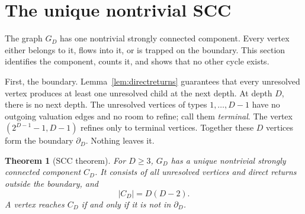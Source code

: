 \documentclass[11pt]{amsart}
\newtheorem{theorem}{Theorem}[section]
\theoremstyle{definition}
\theoremstyle{remark}
\newcommand{\bdD}{\partial_D}
\begin{document}
\section{The unique nontrivial SCC}\label{sec:core}
The graph $G_D$ has one nontrivial strongly connected component.
Every vertex either belongs to it, flows into it, or is trapped on
the boundary.  This section identifies the component, counts it, and
shows that no other cycle exists.

First, the boundary.  Lemma~\ref{lem:directreturns} guarantees that
every unresolved vertex produces at least one unresolved child at the
next depth.  At depth $D$, there is no next depth.  The unresolved
vertices of types $1,\ldots,D-1$ have no outgoing valuation edges and
no room to refine; call them \emph{terminal}.  The vertex
$(2^{D-1}-1,D-1)$ refines only to terminal vertices.  Together these
$D$ vertices form the boundary $\bdD$.  Nothing leaves it.

\begin{theorem}[SCC theorem]\label{thm:core}
For $D\ge3$, $G_D$ has a unique nontrivial strongly connected
component $C_D$.  It consists of all unresolved vertices and direct
returns outside the boundary, and
\[
|C_D|=D(D-2).
\]
A vertex reaches $C_D$ if and only if it is not in $\bdD$.
\end{theorem}
\end{document}
